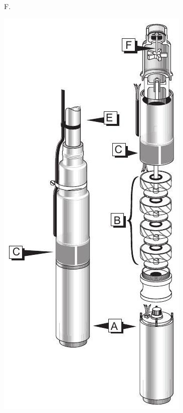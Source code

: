 \documentclass[10pt]{article}
\begin{document}
F.

\includegraphics[max width=\textwidth]{2022_11_03_65aa625ded296bdfd01fg-23(5)}
\end{document}
